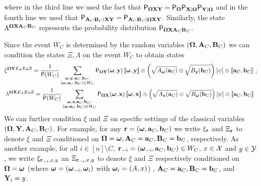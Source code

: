 where in the third line we used the fact that $\P_{\bOmega \bX \bY} = \P_{\bOmega} \P_{\bX | \bOmega} \P_{\bY | \bOmega}$ and in the fourth line we used that $\P_{\bA_C \bB_C | \bX \bY} = \P_{\bA_C \bB_C | \bOmega \bX \bY}$.   Similarly, the state $\Lambda^{\bOmega \bX \bA_C \bB_C}$ represents the probability distribution  $\P_{\bOmega \bX \bA_C \bB_C}$.

Since the event $W_C$ is determined by the random variables $(\bOmega,\bA_C,\bB_C)$ we can {condition} the states $\Xi, \Lambda$ on the event $W_C$ to obtain states
\begin{gather*}
	\xi^{\bOmega \bY E_A E_B \ac} = \frac{1}{\P(W_C)} \sum_{\substack{\bomega, \by, \ba_C, \bb_C: \\ (\bomega,\ba_C,\bb_C) \in W_C}} \P_{\bOmega \bY}(\bomega, \by) \, \puretomixed{\bomega, \by} \otimes \left (\sqrt{A_{\bomega}(\ba_C)} \otimes \sqrt{B_{\by}(\bb_C)} \right ) \left [\psi \right ] \otimes \puretomixed{\ba_C,\bb_C}~, \\
	\lambda^{\bOmega \bX E_A E_B \ac} = \frac{1}{\P(W_C)} \sum_{\substack{\bomega, \bx, \ba_C, \bb_C: \\ (\bomega,\ba_C,\bb_C) \in W_C}} \P_{\bOmega \bX}(\bomega, \bx) \, \puretomixed{\bomega, \bx} \otimes \left (\sqrt{A_{\bx}(\ba_C)} \otimes \sqrt{B_{\bomega}(\bb_C)} \right ) \left [\psi \right ] \otimes \puretomixed{\ba_C,\bb_C}~
\end{gather*}
 
We can further condition $\xi$ and $\Xi$ on specific settings of the classical variables $(\bOmega,\bY,\bA_C,\bB_C)$. For example, for any $\br = (\bomega,\ba_C,\bb_C)$ we write $\xi_\br$ and $\Xi_\br$ to denote $\xi$ and $\Xi$ conditioned on $\bOmega = \bomega, \bA_C = \ba_C,\bB_C = \bb_C$, respectively. As another example, for all $i \in [n] \setminus C$, $\br_\mi = (\bomega_\mi,\ba_C,\bb_C) \in W_C$, $x \in \X$ and $y \in \Y$, we write $\xi_{\br_\mi,x,y}$ an $\Xi_{\br_\mi,x,y}$ to denote $\xi$ and $\Xi$ respectively conditioned on $\bOmega = \bomega$ (where $\bomega = (\bomega_\mi,\bomega_i)$ with $\bomega_i = (A,x)$) ,  $\bA_C = \ba_C, \bB_C = \bb_C$, and $\bY_i = y$.

